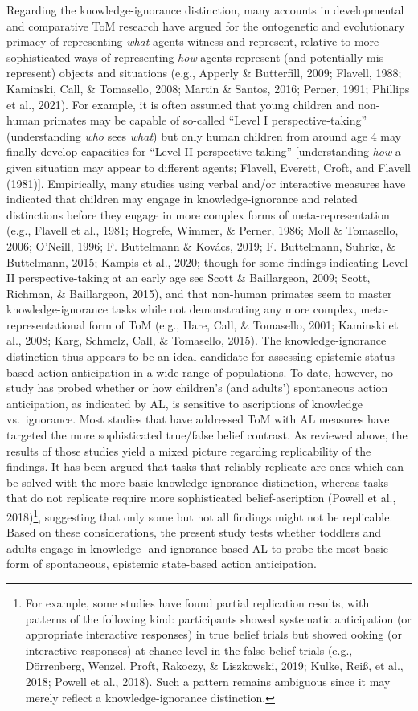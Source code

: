 \documentclass[
  man,floatsintext]{apa6}
\begin{document}
Regarding the knowledge-ignorance distinction, many accounts in developmental and comparative ToM research have argued for the ontogenetic and evolutionary primacy of representing \emph{what} agents witness and represent, relative to more sophisticated ways of representing \emph{how} agents represent (and potentially mis-represent) objects and situations (e.g., Apperly \& Butterfill, 2009; Flavell, 1988; Kaminski, Call, \& Tomasello, 2008; Martin \& Santos, 2016; Perner, 1991; Phillips et al., 2021). For example, it is often assumed that young children and non-human primates may be capable of so-called ``Level I perspective-taking'' (understanding \emph{who} sees \emph{what}) but only human children from around age 4 may finally develop capacities for ``Level II perspective-taking'' {[}understanding \emph{how} a given situation may appear to different agents; Flavell, Everett, Croft, and Flavell (1981){]}. Empirically, many studies using verbal and/or interactive measures have indicated that children may engage in knowledge-ignorance and related distinctions before they engage in more complex forms of meta-representation (e.g., Flavell et al., 1981; Hogrefe, Wimmer, \& Perner, 1986; Moll \& Tomasello, 2006; O'Neill, 1996; F. Buttelmann \& Kovács, 2019; F. Buttelmann, Suhrke, \& Buttelmann, 2015; Kampis et al., 2020; though for some findings indicating Level II perspective-taking at an early age see Scott \& Baillargeon, 2009; Scott, Richman, \& Baillargeon, 2015), and that non-human primates seem to master knowledge-ignorance tasks while not demonstrating any more complex, meta-representational form of ToM (e.g., Hare, Call, \& Tomasello, 2001; Kaminski et al., 2008; Karg, Schmelz, Call, \& Tomasello, 2015). The knowledge-ignorance distinction thus appears to be an ideal candidate for assessing epistemic status-based action anticipation in a wide range of populations.
To date, however, no study has probed whether or how children's (and adults') spontaneous action anticipation, as indicated by AL, is sensitive to ascriptions of knowledge vs.~ignorance. Most studies that have addressed ToM with AL measures have targeted the more sophisticated true/false belief contrast. As reviewed above, the results of those studies yield a mixed picture regarding replicability of the findings. It has been argued that tasks that reliably replicate are ones which can be solved with the more basic knowledge-ignorance distinction, whereas tasks that do not replicate require more sophisticated belief-ascription (Powell et al., 2018)\footnote{For example, some studies have found partial replication results, with patterns of the following kind: participants showed systematic anticipation (or appropriate interactive responses) in true belief trials but showed ooking (or interactive responses) at chance level in the false belief trials (e.g., Dörrenberg, Wenzel, Proft, Rakoczy, \& Liszkowski, 2019; Kulke, Reiß, et al., 2018; Powell et al., 2018). Such a pattern remains ambiguous since it may merely reflect a knowledge-ignorance distinction.}, suggesting that only some but not all findings might not be replicable. Based on these considerations, the present study tests whether toddlers and adults engage in knowledge- and ignorance-based AL to probe the most basic form of spontaneous, epistemic state-based action anticipation.
\end{document}
